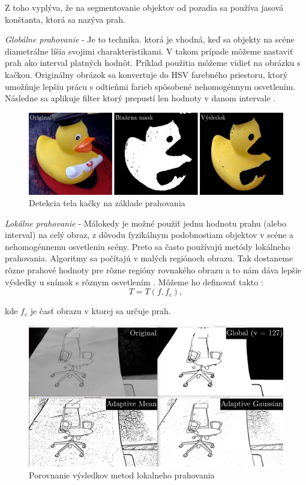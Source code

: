 Z toho vyplýva, že na segmentovanie objektov od pozadia sa používa jasová konštanta, ktorá sa nazýva prah. 


\textit{Globálne prahovanie} - Je to technika. ktorá je vhodná, keď sa objekty na scéne diametrálne líšia svojimi charakteristikami. V takom prípade môžeme nastaviť prah ako interval platných hodnôt. Príklad použitia môžeme vidieť na obrázku s kačkou. Originálny obrázok sa konvertuje do HSV farebného priestoru, ktorý umožňuje lepšiu prácu s odtieňmi farieb spôsobené nehomogénnym osvetlením. Následne sa aplikuje filter ktorý prepustí len hodnoty v danom intervale \cite{fit_trasholding}.

\begin{figure}[H]
\begin{center}
	\includegraphics[scale=0.25]{images/trasholding_duck}
	\caption{Detekcia tela kačky na základe prahovania}
	\end{center}
\end{figure}


\textit{Lokálne prahovanie} - Málokedy je možné použiť jednu hodnotu prahu (alebo interval) na celý obraz, z dôvodu fyzikálnym podobnostiam objektov v scéne a  nehomogénnemu osvetleniu scény. Preto sa často používajú metódy lokálneho prahovania. Algoritmy sa počítajú v malých regiónoch obrazu. Tak dostaneme rôzne prahové hodnoty pre rôzne regióny rovnakého obrazu a to nám dáva lepšie výsledky u snímok s rôznym osvetlením \cite{fit_trasholding}\cite{openCV_trasholding}. Môžeme ho definovať takto : 
$$T=T(f {,} f_c){,}$$

kde $f_c$ je časť obrazu v ktorej sa určuje prah. 

\begin{figure}[H]
\begin{center}
	\includegraphics[scale=0.14]{images/trasholding}
	\caption{Porovnanie výsledkov metod lokalneho prahovania}
	\end{center}
\end{figure}



